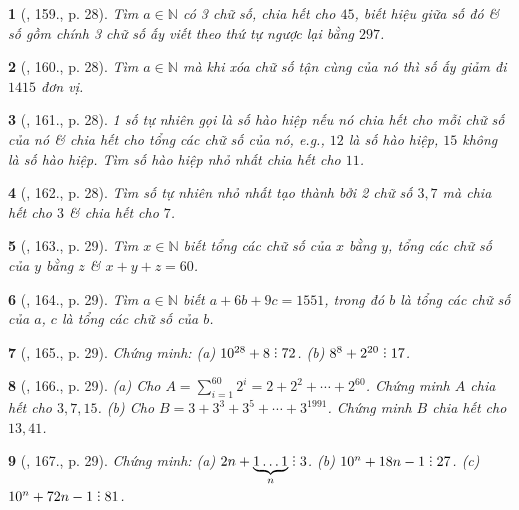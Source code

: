 \documentclass{article}
\newtheorem{baitoan}{}
\DeclareRobustCommand{\divby}{%
	\mathrel{\vbox{\baselineskip.65ex\lineskiplimit0pt\hbox{.}\hbox{.}\hbox{.}}}%
}
\begin{document}
\begin{baitoan}[\cite{Binh_Toan_6_tap_1}, 159., p. 28]
	Tìm $a\in\mathbb{N}$ có 3 chữ số, chia hết cho $45$, biết hiệu giữa số đó \& số gồm chính 3 chữ số ấy viết theo thứ tự ngược lại bằng $297$.
\end{baitoan}

\begin{baitoan}[\cite{Binh_Toan_6_tap_1}, 160., p. 28]
	Tìm $a\in\mathbb{N}$  mà khi xóa chữ số tận cùng của nó thì số ấy giảm đi $1415$ đơn vị.
\end{baitoan}

\begin{baitoan}[\cite{Binh_Toan_6_tap_1}, 161., p. 28]
	1 số tự nhiên gọi là {\rm số hào hiệp} nếu nó chia hết cho mỗi chữ số của nó \& chia hết cho tổng các chữ số của nó, e.g., $12$ là số hào hiệp, $15$ không là số hào hiệp. Tìm số hào hiệp nhỏ nhất chia hết cho $11$.
\end{baitoan}

\begin{baitoan}[\cite{Binh_Toan_6_tap_1}, 162., p. 28]
	Tìm số tự nhiên nhỏ nhất tạo thành bởi 2 chữ số $3,7$ mà chia hết cho $3$ \& chia hết cho $7$.
\end{baitoan}

\begin{baitoan}[\cite{Binh_Toan_6_tap_1}, 163., p. 29]
	Tìm $x\in\mathbb{N}$ biết tổng các chữ số của $x$ bằng $y$, tổng các chữ số của $y$ bằng $z$ \& $x + y + z = 60$.
\end{baitoan}

\begin{baitoan}[\cite{Binh_Toan_6_tap_1}, 164., p. 29]
	Tìm $a\in\mathbb{N}$ biết $a + 6b + 9c = 1551$, trong đó $b$ là tổng các chữ số của $a$, $c$ là tổng các chữ số của $b$.
\end{baitoan}

\begin{baitoan}[\cite{Binh_Toan_6_tap_1}, 165., p. 29]
	Chứng minh: (a) $10^{28} + 8\divby72$. (b) $8^8 + 2^{20}\divby17$.
\end{baitoan}

\begin{baitoan}[\cite{Binh_Toan_6_tap_1}, 166., p. 29]
	(a) Cho $A = \sum_{i=1}^{60} 2^i = 2 + 2^2 + \cdots + 2^{60}$. Chứng minh $A$ chia hết cho $3,7,15$. (b) Cho $B = 3 + 3^3 + 3^5 + \cdots + 3^{1991}$. Chứng minh $B$ chia hết cho $13,41$.
\end{baitoan}

\begin{baitoan}[\cite{Binh_Toan_6_tap_1}, 167., p. 29]
	Chứng minh: (a) $2n + \underbrace{1\ldots1}_{n}\divby3$. (b) $10^n + 18n - 1\divby27$. (c) $10^n + 72n -1\divby81$.
\end{baitoan}
\end{document}
